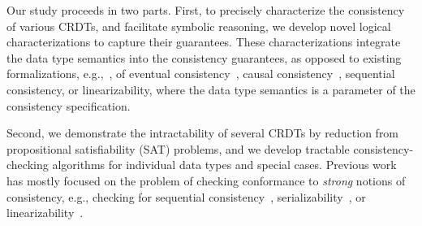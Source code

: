 Our study proceeds in two parts. First, to precisely characterize the consistency of various CRDTs, and facilitate symbolic reasoning, we develop novel logical characterizations to capture their guarantees. These characterizations integrate the data type semantics into the consistency guarantees, as opposed to existing formalizations, e.g.,~\cite{DBLP:journals/ftpl/Burckhardt14, DBLP:conf/popl/BurckhardtGYZ14}, of eventual consistency~\cite{DBLP:conf/sosp/TerryTPDSH95}, causal consistency~\cite{DBLP:journals/cacm/Lamport78}, sequential consistency, or linearizability, where the data type semantics is a parameter of the consistency specification. 

Second, we demonstrate the intractability of several CRDTs by reduction from propositional satisfiability (SAT) problems, and we develop tractable consistency-checking algorithms for individual data types and special cases. Previous work has mostly focused on the problem of checking conformance to \emph{strong} notions of consistency, e.g., checking for sequential consistency~\cite{DBLP:conf/cav/HenzingerQR99a, DBLP:journals/tpds/Qadeer03, DBLP:conf/cav/BinghamCHQZ04, DBLP:conf/pldi/BurckhardtAM07}, serializability~\cite{DBLP:conf/fmcad/0002OPTZ07, DBLP:conf/cav/FarzanM08, DBLP:conf/pldi/GuerraouiHJS08, DBLP:conf/pldi/EmmiMM10}, or linearizability~\cite{DBLP:journals/jpdc/WingG93, DBLP:conf/pldi/BurckhardtDMT10, DBLP:conf/pldi/EmmiEH15, DBLP:journals/concurrency/Lowe17}. 


